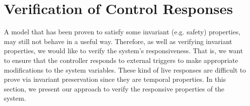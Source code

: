 \section{Verification of Control Responses}
\label{sec:verificationResponses}

A model that has been proven to satisfy some invariant (e.g. safety) properties, 
may still not behave in a useful way.
Therefore, as well as verifying invariant properties, we would like to verify 
the system's responsiveness. That is, we want to ensure that the controller 
responds to external triggers to make appropriate modifications to the system variables. 
These kind of live responses are difficult to prove via invariant
preservation since they are temporal properties.  In this section, we
present our approach to verify the responsive properties of the system.


